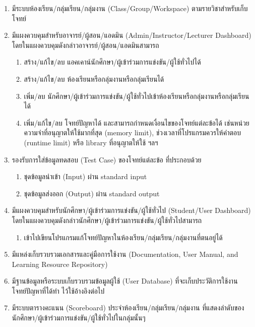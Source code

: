 \documentclass[12pt,oneside,openright,a4paper]{cpe-thai-project}
\begin{document}
\begin{enumerate}
\begin{enumerate}
    \end{enumerate}
    \item มีระบบห้องเรียน/กลุ่มเรียน/กลุ่มงาน (Class/Group/Workspace) ตามรายวิชาสำหรับเก็บโจทย์
    \item มีแผงควบคุมสำหรับอาจารย์/ผู้สอน/แอดมิน (Admin/Instructor/Lecturer Dashboard) โดยในแผงควบคุมดังกล่าวอาจารย์/ผู้สอน/แอดมินสามารถ
    \begin{enumerate}
        \item สร้าง/แก้ไข/ลบ แอคเคาน์นักศึกษา/ผู้เข้าร่วมการแข่งขัน/ผู้ใช้ทั่วไปได้
        \item สร้าง/แก้ไข/ลบ ห้องเรียนหรือกลุ่มงานหรือกลุ่มเรียนได้
        \item เพิ่ม/ลบ นักศึกษา/ผู้เข้าร่วมการแข่งขัน/ผู้ใช้ทั่วไปเข้าห้องเรียนหรือกลุ่มงานหรือกลุ่มเรียนได้
        \item เพิ่ม/แก้ไข/ลบ โจทย์ปัญหาได้ และสามารถกำหนดเงื่อนไขของโจทย์แต่ละข้อได้ เช่นหน่วยความจำที่อนุญาตให้ใช้มากที่สุด (memory limit), ช่วงเวลาที่โปรแกรมควรให้คำตอบ (runtime limit) หรือ library ที่อนุญาตให้ใช้ ฯลฯ
    \end{enumerate}
    \item รองรับการใส่ข้อมูลทดสอบ (Test Case) ของโจทย์แต่ละข้อ ที่ประกอบด้วย
    \begin{enumerate}
        \item ชุดข้อมูลนำเข้า (Input) ผ่าน standard input
        \item ชุดข้อมูลส่งออก (Output) ผ่าน standard output
    \end{enumerate}
    \item มีแผงควบคุมสำหรับนักศึกษา/ผู้เข้าร่วมการแข่งขัน/ผู้ใช้ทั่วไป (Student/User Dashboard) โดยในแผงควบคุมดังกล่าวนักศึกษา/ผู้เข้าร่วมการแข่งขัน/ผู้ใช้ทั่วไปสามารถ
    \begin{enumerate}
        \item เข้าไปเขียนโปรแกรมแก้โจทย์ปัญหาในห้องเรียน/กลุ่มเรียน/กลุ่มงานที่ตนอยู่ได้
    \end{enumerate}
    \item มีแหล่งเก็บรวบรวมเอกสารและคู่มือการใช้งาน (Documentation, User Manual, and Learning Resource Repository)
    \item มีฐานข้อมูลหรือระบบเก็บรวบรวมข้อมูลผู้ใช้ (User Database) ที่จะเก็บประวัติการใช้งาน โจทย์ปัญหาที่ได้ทำ ไว้ใช้อ้างอิงต่อไป
    \item มีระบบตารางคะแนน (Scoreboard) ประจำห้องเรียน/กลุ่มเรียน/กลุ่มงาน ที่แสดงลำดับของนักศึกษา/ผู้เข้าร่วมการแข่งขัน/ผู้ใช้ทั่วไปในกลุ่มนั้นๆ
\end{enumerate}
\end{document}
